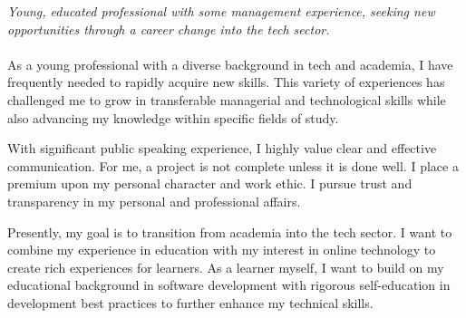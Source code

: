 
\vspace{-1.3em} %

\begin{multicols}{2}  %
\noindent \textit{Young, educated professional with some management experience, seeking new opportunities through a career change into the tech sector.}\\\\

As a young professional with a diverse background in tech and academia, I have frequently needed to rapidly acquire new skills. This variety of experiences has challenged me to grow in transferable managerial and technological skills while also advancing my knowledge within specific fields of study.

With significant public speaking experience, I highly value clear and effective communication. For me, a project is not complete unless it is done well. I place a premium upon my personal character and work ethic. I pursue trust and transparency in my personal and professional affairs.

Presently, my goal is to transition from academia into the tech sector. I want to combine my experience in education with my interest in online technology to create rich experiences for learners. As a learner myself, I want to build on my educational background in software development with rigorous self-education in development best practices to further enhance my technical skills.

\end{multicols}

